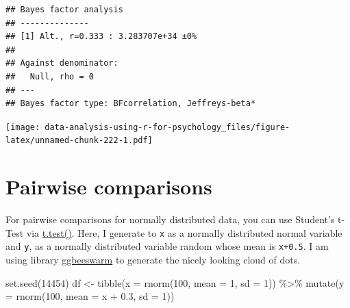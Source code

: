 \documentclass[
]{book}
\newenvironment{Shaded}{\begin{snugshade}}{\end{snugshade}}
\newcommand{\AttributeTok}[1]{\textcolor[rgb]{0.77,0.63,0.00}{#1}}
\newcommand{\ConstantTok}[1]{\textcolor[rgb]{0.00,0.00,0.00}{#1}}
\newcommand{\DecValTok}[1]{\textcolor[rgb]{0.00,0.00,0.81}{#1}}
\newcommand{\FloatTok}[1]{\textcolor[rgb]{0.00,0.00,0.81}{#1}}
\newcommand{\FunctionTok}[1]{\textcolor[rgb]{0.00,0.00,0.00}{#1}}
\newcommand{\NormalTok}[1]{#1}
\newcommand{\OtherTok}[1]{\textcolor[rgb]{0.56,0.35,0.01}{#1}}
\newcommand{\SpecialCharTok}[1]{\textcolor[rgb]{0.00,0.00,0.00}{#1}}
\newcommand{\StringTok}[1]{\textcolor[rgb]{0.31,0.60,0.02}{#1}}
\begin{document}
\begin{verbatim}
## Bayes factor analysis
## --------------
## [1] Alt., r=0.333 : 3.283707e+34 ±0%
## 
## Against denominator:
##   Null, rho = 0 
## ---
## Bayes factor type: BFcorrelation, Jeffreys-beta*
\end{verbatim}

\begin{Shaded}
\end{Shaded}

\texttt{[image: data-analysis-using-r-for-psychology\_files/figure-latex/unnamed-chunk-222-1.pdf]}

\hypertarget{pairwise-comparisons}{%
\section{Pairwise comparisons}\label{pairwise-comparisons}}

For pairwise comparisons for normally distributed data, you can use Student's t-Test via \href{https://stat.ethz.ch/R-manual/R-devel/library/stats/html/t.test.html}{t.test()}. Here, I generate to \texttt{x} as a normally distributed normal variable and \texttt{y}, as a normally distributed variable random whose mean is \texttt{x+0.5}. I am using library \href{https://github.com/eclarke/ggbeeswarm}{ggbeeswarm} to generate the nicely looking cloud of dots.

\begin{Shaded}
\begin{Highlighting}[]
\FunctionTok{set.seed}\NormalTok{(}\DecValTok{14454}\NormalTok{)}
\NormalTok{df }\OtherTok{\textless{}{-}} 
  \FunctionTok{tibble}\NormalTok{(}\AttributeTok{x =} \FunctionTok{rnorm}\NormalTok{(}\DecValTok{100}\NormalTok{, }\AttributeTok{mean =} \DecValTok{1}\NormalTok{, }\AttributeTok{sd =} \DecValTok{1}\NormalTok{)) }\SpecialCharTok{\%\textgreater{}\%}
  \FunctionTok{mutate}\NormalTok{(}\AttributeTok{y =} \FunctionTok{rnorm}\NormalTok{(}\DecValTok{100}\NormalTok{, }\AttributeTok{mean =}\NormalTok{ x }\SpecialCharTok{+} \FloatTok{0.3}\NormalTok{, }\AttributeTok{sd =} \DecValTok{1}\NormalTok{))}
\end{Highlighting}
\end{Shaded}
\end{document}
